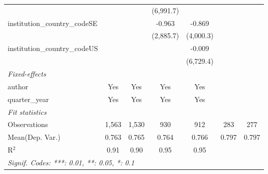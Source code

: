 \begin{tabular}{lcccccc}
                                         &                &                & (6,991.7)     &               &     &   \\   
   institution\_country\_codeSE          &                &                & -0.963        & -0.869        &     &   \\   
                                         &                &                & (2,885.7)     & (4,000.3)     &     &   \\   
   institution\_country\_codeUS          &                &                &               & -0.009        &     &   \\   
                                         &                &                &               & (6,729.4)     &     &   \\   
   \midrule
   \emph{Fixed-effects}\\
   author                                & Yes            & Yes            & Yes           & Yes           &     & \\  
   quarter\_year                         & Yes            & Yes            & Yes           & Yes           &     & \\  
   \midrule
   \emph{Fit statistics}\\
   Observations                          & 1,563          & 1,530          & 930           & 912           & 283 & 277\\  
Mean(Dep. Var.) & 0.763 & 0.765 & 0.764 & 0.766 & 0.797 & 0.797 \\
   R$^2$                                 & 0.91           & 0.90           & 0.95          & 0.95          &     & \\  
   \midrule \midrule
   \multicolumn{7}{l}{\emph{Signif. Codes: ***: 0.01, **: 0.05, *: 0.1}}\\
\end{tabular}
\par\endgroup
